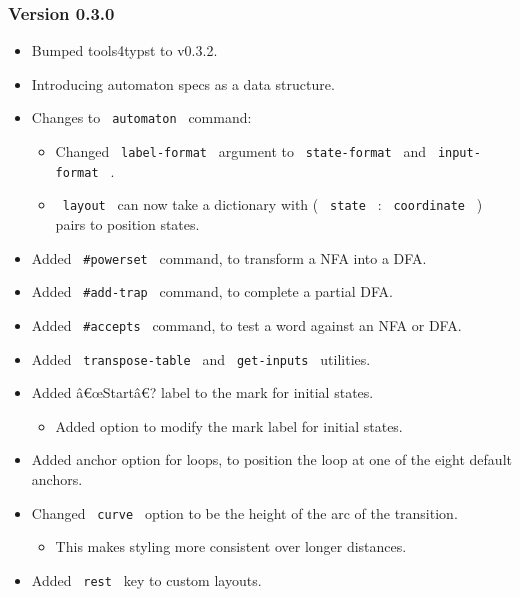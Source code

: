 \subsubsection{Version 0.3.0}\label{version-0.3.0}

\begin{itemize}
\tightlist
\item
  Bumped tools4typst to v0.3.2.
\item
  Introducing automaton specs as a data structure.
\item
  Changes to \texttt{\ automaton\ } command:

  \begin{itemize}
  \tightlist
  \item
    Changed \texttt{\ label-format\ } argument to
    \texttt{\ state-format\ } and \texttt{\ input-format\ } .
  \item
    \texttt{\ layout\ } can now take a dictionary with (
    \texttt{\ state\ } : \texttt{\ coordinate\ } ) pairs to position
    states.
  \end{itemize}
\item
  Added \texttt{\ \#powerset\ } command, to transform a NFA into a DFA.
\item
  Added \texttt{\ \#add-trap\ } command, to complete a partial DFA.
\item
  Added \texttt{\ \#accepts\ } command, to test a word against an NFA or
  DFA.
\item
  Added \texttt{\ transpose-table\ } and \texttt{\ get-inputs\ }
  utilities.
\item
  Added â€œStartâ€? label to the mark for initial states.

  \begin{itemize}
  \tightlist
  \item
    Added option to modify the mark label for initial states.
  \end{itemize}
\item
  Added anchor option for loops, to position the loop at one of the
  eight default anchors.
\item
  Changed \texttt{\ curve\ } option to be the height of the arc of the
  transition.

  \begin{itemize}
  \tightlist
  \item
    This makes styling more consistent over longer distances.
  \end{itemize}
\item
  Added \texttt{\ rest\ } key to custom layouts.
\end{itemize}

